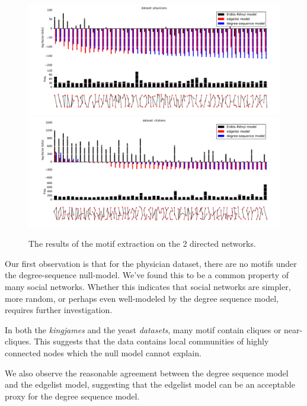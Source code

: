 \begin{figure}[p]
  \includegraphics[width=\textwidth]{./images/physicians/compare-plot.pdf}\\
  \includegraphics[width=\textwidth]{./images/citations/compare-plot.pdf}\\
  \caption{The results of the motif extraction on the 2 directed networks.}
  \label{figure:plot-dir}
\end{figure}

Our first observation is that for the physician dataset, there are no motifs under the degree-sequence null-model. We've found this to be a common property of many social networks. Whether this indicates that social networks are simpler, more random, or perhaps even well-modeled by the degree sequence model, requires further investigation. 

In both the \emph{kingjames} and the yeast \emph{datasets}, many motif contain cliques or near-cliques. This suggests that the data contains local communities of highly connected nodes which the null model cannot explain.

We also observe the reasonable agreement between the degree sequence model and the edgelist model, suggesting that the edgelist model can be an acceptable proxy for the degree sequence model. 

